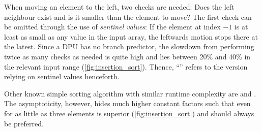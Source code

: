 When moving an element to the left, two checks are needed:
Does the left neighbour exist and is it smaller than the element to move?
The first check can be omitted through the use of \emph{sentinel values}:
If the element at index \(-1\) is at least as small as any value in the input array, the leftwards motion stops there at the latest.
Since a DPU has no branch predictor, the slowdown from performing twice as many checks as needed is quite high and lies between 20\% and 40\% in the relevant input range (\cref{fig:insertion_sort}).%
Thence, \enquote{\IS{}} refers to the version relying on sentinel values henceforth.

\begin{note}
	Other known simple sorting algorithm with similar runtime complexity are \SelS{} and \BS{}.
	The asymptoticity, however, hides much higher constant factors such that even for as little as three elements \IS{} is superior (\cref{fig:insertion_sort}) and should always be preferred.
\end{note}
